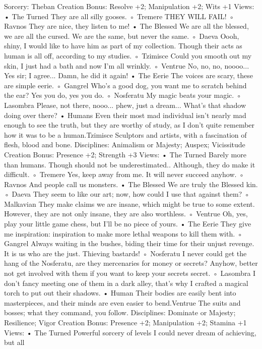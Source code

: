 \documentclass[10pt,a4paper]{article}
\begin{document}
Sorcery: Theban
Creation Bonus:
Resolve +2; Manipulation +2; Wits +1
Views:
• The Turned
They are all silly gooses.
◦ Tremere
THEY WILL FAIL!
◦ Ravnos
They are nice, they listen to me!
• The Blessed
We are all the blessed, we are all the cursed. We are the same, but
never the same.
◦ Daeva
Oooh, shiny, I would like to have him as part of my collection.
Though their acts as human is all off, according to my studies.
◦ Tzimisce
Could you smooth out my skin, I just had a bath and now I'm all
wrinkly.
◦ Ventrue
No, no, no, noooo... Yes sir; I agree... Damn, he did it again!
• The Eerie
The voices are scary, these are simple eerie.
◦ Gangrel
Who's a good dog, you want me to scratch behind the ear? Yes
you do, yes you do.
◦ Nosferatu
My magic beats your magic.
◦ Lasombra
Please, not there, nooo... phew, just a dream... What's that
shadow doing over there?
• Humans
Even their most mad individual isn't nearly mad enough to see the
truth, but they are worthy of study, as I don't quite remember how it
was to be a human.Tzimisce
Sculptors and artists, with a fascination of flesh, blood and bone.
Disciplines: Animalism or Majesty; Auspex; Vicissitude
Creation Bonus:
Presence +2; Strength +3
Views:
• The Turned
Barely more than humans. Though should not be underestimated..
Although, they do make it difficult.
◦ Tremere
Yes, keep away from me. It will never succeed anyhow.
◦ Ravnos
And people call us monsters.
• The Blessed
We are truly the Blessed kin.
◦ Daeva
They seem to like our art; now, how could I use that against
them?
◦ Malkavian
They make claims we are insane, which might be true to some
extent. However, they are not only insane, they are also
worthless.
◦ Ventrue
Oh, yes, play your little game chess, but I'll be no piece of yours.
• The Eerie
They give me inspiration: inspiration to make more lethal weapons
to kill them with.
◦ Gangrel
Always waiting in the bushes, biding their time for their unjust
revenge. It is us who are the just. Thieving bastards!
◦ Nosferatu
I never could get the hang of the Nosferatu, are they mercenaries
for money or secrets? Anyhow, better not get involved with them
if you want to keep your secrets secret.
◦ Lasombra
I don't fancy meeting one of them in a dark alley, that's why I
crafted a magical torch to put out their shadows.
• Human
Their bodies are easily bent into masterpieces, and their minds are
even easier to bend.Ventrue
The suits and bosses; what they command, you follow.
Disciplines: Dominate or Majesty; Resilience; Vigor
Creation Bonus:
Presence +2; Manipulation +2; Stamina +1
Views:
• The Turned
Powerful sorcery of levels I could never dream of achieving, but all
\end{document}
